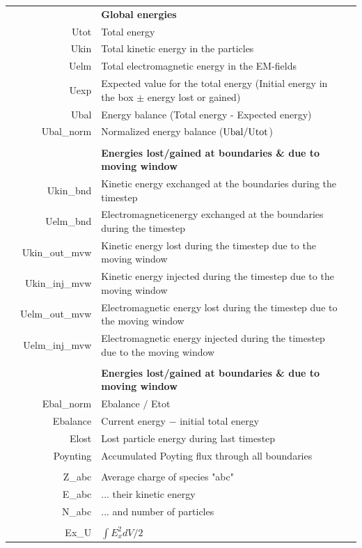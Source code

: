 \documentclass[11pt]{article}
\begin{document}
\begin{tabularx}{\textwidth}{X r | l X}
&	 & {\bf Global energies}& \\
&Utot & Total energy& \\
&Ukin&  Total kinetic energy in the particles&\\
&Uelm& Total electromagnetic energy in the EM-fields&\\
&Uexp& Expected value for the total energy (Initial energy in the box $\pm$ energy lost or gained)&\\
&Ubal& Energy balance (Total energy - Expected energy)&\\
&Ubal\_norm& Normalized energy balance (${\rm Ubal/Utot}$)&\\
& & & \\
&	 & {\bf Energies lost/gained at boundaries \& due to moving window}& \\
&Ukin\_bnd& Kinetic energy exchanged at the boundaries during the timestep &\\
&Uelm\_bnd& Electromagneticenergy exchanged at the boundaries during the timestep &\\
&Ukin\_out\_mvw& Kinetic energy lost during the timestep due to the moving window&\\
&Ukin\_inj\_mvw& Kinetic energy injected during the timestep due to the moving window&\\
&Uelm\_out\_mvw& Electromagnetic energy lost during the timestep due to the moving window&\\
&Uelm\_inj\_mvw& Electromagnetic energy injected during the timestep due to the moving window&\\
& & & \\
&	 & {\bf Energies lost/gained at boundaries \& due to moving window}& \\
& Ebal\_norm & Ebalance $/$ Etot &\\
& Ebalance & Current energy $-$ initial total energy&\\
& Elost & Lost particle energy during last timestep &\\
& Poynting & Accumulated Poyting flux through all boundaries&\\
& & & \\
& Z\_abc & Average charge of species "abc" &\\
& E\_abc & ... their kinetic energy &\\
& N\_abc & ... and number of particles &\\
& & & \\
& Ex\_U & $\int E_x^2 dV /2$ & \\

\end{tabularx}
\end{document}
